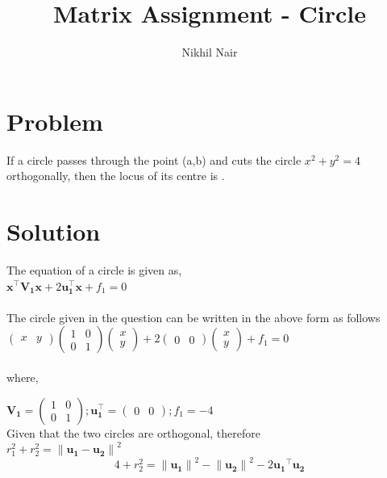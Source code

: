 \documentclass[journal,12pt,twocolumn]{IEEEtran}
\title{\mytitle}
\title{
Matrix Assignment - Circle
}
\author{Nikhil Nair}
\newcommand{\myvec}[1]{\ensuremath{\begin{pmatrix}#1\end{pmatrix}}}
\let\vec\mathbf
\begin{document}
\maketitle
\tableofcontents
\bigskip


\section{\textbf{Problem}}
If  a circle passes through the point (a,b) and cuts the circle $x^2+y^2=4$ orthogonally, then the locus of its centre is .\\


\section{\textbf{Solution}}
The equation of a circle is given as,   \\

${\vec{x^{\top}V_1 x} + 2\vec{u_1^{\top}x}} + f_1=0$
\\
\\
The circle given in the question can be written in the above form as follows
\\

$\myvec{x & y}\myvec{1&0\\ 0&1}\myvec{x\\y} + 2\myvec{0&0}\myvec{x\\y} + f_1 = 0$\\
\\
where,

$\vec{V_1}=\myvec{1&0\\ 0&1} ; \vec{u_1^{\top}}=\myvec{0&0} ; f_1=-4$
\\

Given that the two circles are orthogonal, therefore
\\

$r_1^2 + r_2^2 = {\lVert \vec{u_1} - \vec{u_2} \rVert}^2$
\\
\begin{equation}
4 + r_2^2 = {\lVert \vec{u_1} \rVert}^2 -{\lVert \vec{u_2} \rVert}^2 -2 \vec{ u_1}^{\top}\vec{u_2} \label{eq-1}
\end{equation}
\end{document}
